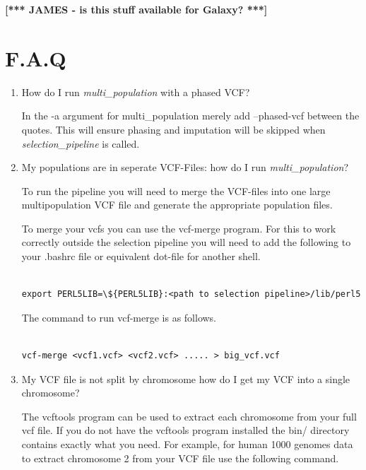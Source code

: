 \documentclass[a4paper,10pt]{article}
\begin{document}
\noindent
{\bf\small\color{blue} [*** JAMES - is this stuff available for
  Galaxy? ***]}

\section{F.A.Q}
\begin{enumerate}
\item How do I run \emph{multi\_population} with a phased VCF?

In the -a argument for multi\_population merely add --phased-vcf
between the quotes. This will ensure phasing and imputation will be
skipped when \emph{selection\_pipeline} is called.


\item My populations are in seperate VCF-Files: how do I run \emph{multi\_population}?

To run the pipeline you will need to merge the VCF-files into one
large multipopulation VCF file and generate the appropriate population
files. 

To merge your vcfs you can use the vcf-merge program. For this to work
correctly outside the selection pipeline you will need to add the
following to your .bashrc file or equivalent dot-file for another
shell.\\

\begin{verbatim}

export PERL5LIB=\${PERL5LIB}:<path to selection pipeline>/lib/perl5

\end{verbatim}

The command to run vcf-merge is as follows.

\begin{verbatim}

vcf-merge <vcf1.vcf> <vcf2.vcf> ..... > big_vcf.vcf

\end{verbatim}

\item My VCF file is not split by chromosome how do I get my VCF into a single chromosome?

The vcftools program can be used to extract each chromosome from your
full vcf file. If you do not have the vcftools program installed the
bin/ directory  contains exactly what you need. For example, for human
1000 genomes data to extract chromosome 2 from your VCF file use the
following command. 


\end{enumerate}
\end{document}

